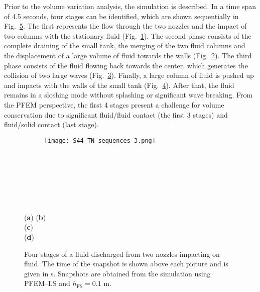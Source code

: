 \documentclass[final,3p,times]{elsarticle}
\begin{document}
Prior to the volume variation analysis, the simulation is described. In a time span of 4.5 seconds, four stages can be identified, which are shown sequentially in Fig.~\ref{Fig:TNs}. The first represents the flow through the two nozzles and the impact of two columns with the stationary fluid (Fig.~\ref{Fig:TNs_a}). The second phase consists of the complete draining of the small tank, the merging of the two fluid columns and the displacement of a large volume of fluid towards the walls (Fig.~\ref{Fig:TNs_b}). The third phase consists of the fluid flowing back towards the center, which generates the collision of two large waves (Fig.~\ref{Fig:TNs_c}). Finally, a large column of fluid is pushed up and impacts with the walls of the small tank (Fig.~\ref{Fig:TNs_d}). After that, the fluid remains in a sloshing mode without splashing or significant wave breaking. From the PFEM perspective, the first 4 stages present a challenge for volume conservation due to significant fluid/fluid contact (the first 3 stages) and fluid/solid contact (last stage).


\begin{figure}[t!]
\captionsetup[subfigure]{labelformat=empty}
\centering 
	\begin{subfigure}[b]{1.0\textwidth}
		\texttt{[image: S44\_TN\_sequences\_3.png]}
		\caption{}
		\label{Fig:TNs_a}
	\end{subfigure}
	\\
	\begin{subfigure}[b]{1.0\textwidth} \caption{} \label{Fig:TNs_b}
	\end{subfigure}
	~
	\begin{subfigure}[b]{1.0\textwidth} \caption{} \label{Fig:TNs_c}
	\end{subfigure} 
	~
	\begin{subfigure}[b]{1.0\textwidth} \caption{} \label{Fig:TNs_d}
	\end{subfigure}
	\\
	\vspace{-115mm}
	\hspace{-75mm} 
	\footnotesize{(\textbf{a})}
	\hspace{85mm} 
	(\textbf{b})
	\\
	\vspace{30mm}
	\hspace*{-127mm}	(\textbf{c})
	\\
	\vspace{22mm}
	\hspace*{-160mm}  (\textbf{d})
	\\
	\vspace{32mm}
\caption{Four stages of a fluid discharged from two nozzles impacting on fluid. The time of the snapshot is shown above each picture and is given in s. Snapshots are obtained from the simulation using PFEM--LS and $h_\mathrm{FS} = 0.1$ m.}
\label{Fig:TNs}
\end{figure}
\end{document}
